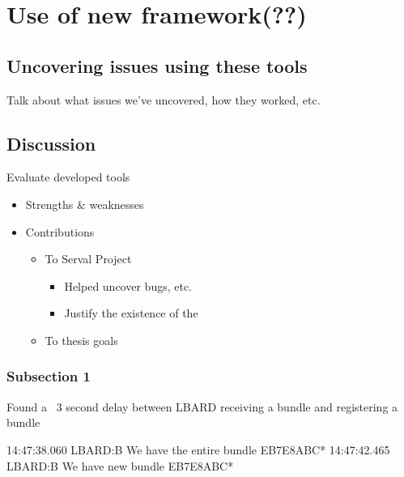 
\chapter{Use of new framework(??)} %

\label{Chapter7} %


\section{Uncovering issues using these tools}
Talk about what issues we've uncovered, how they worked, etc.



\section{Discussion}
Evaluate developed tools
\begin{itemize}
    \item Strengths \& weaknesses
    \item Contributions
    \begin{itemize}
        \item To Serval Project
        \begin{itemize}
            \item Helped uncover bugs, etc.
            \item Justify the existence of the 
        \end{itemize}
        \item To thesis goals
    \end{itemize}
\end{itemize}



\subsection{Subsection 1}
Found a ~3 second delay between LBARD receiving a bundle and registering a bundle

14:47:38.060 LBARD:B We have the entire bundle EB7E8ABC*
14:47:42.465 LBARD:B We have new bundle EB7E8ABC*



